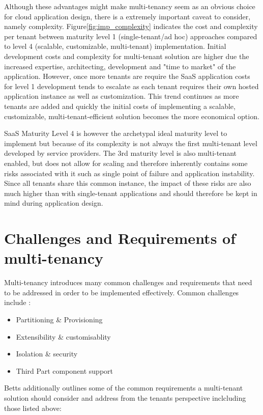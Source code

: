 Although these advantages might make multi-tenancy seem as an obvious choice for cloud application design, there is a extremely important caveat to consider, namely complexity. Figure\ref{fig:imp_complexity} indicates the cost and complexity per tenant between maturity level 1 (single-tenant/ad hoc) approaches compared to level 4 (scalable, customizable, multi-tenant) implementation. Initial development costs and complexity for multi-tenant solution are higher due the increased expertise, architecting, development and "time to market" of the application. However, once more tenants are require the SaaS application costs for level 1 development tends to escalate as each tenant requires their own hosted application instance as well as customization. This trend continues as more tenants are added and quickly the initial costs of implementing a scalable, customizable, multi-tenant-efficient solution becomes the more economical option. 



SaaS Maturity Level 4 is however the archetypal ideal maturity level to implement but because of its complexity is not always the first multi-tenant level developed by service providers. The 3rd maturity level is also multi-tenant enabled, but does not allow for scaling and therefore inherently contains some risks associated with it such as single point of failure and application instability. Since all tenants share this common instance, the impact of these risks are also much higher than with single-tenant applications and should therefore be kept in mind during application design. 

\section{Challenges and Requirements of multi-tenancy}
Multi-tenancy introduces many common challenges and requirements that need to be addressed in order to be implemented effectively. Common challenges include \cite{Betts2012-ad}:
\begin{itemize}
\item Partitioning \& Provisioning
\item Extensibility \& customisablity
\item Isolation \& security
\item Third Part component support
\end{itemize}

Betts \cite{Betts2012-ad} additionally outlines some of the common requirements a multi-tenant solution should consider and address from the tenants perspective inclcluding those listed above: 

